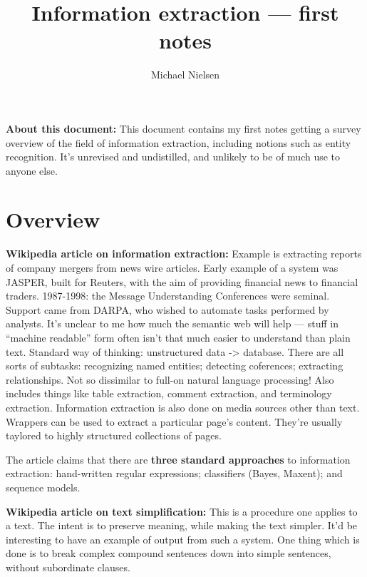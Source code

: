 
\title{Information extraction --- first notes}
\author{Michael Nielsen}



\maketitle

\textbf{About this document:} This document contains my first notes
getting a survey overview of the field of information extraction,
including notions such as entity recognition.  It's unrevised and
undistilled, and unlikely to be of much use to anyone else.


\section{Overview}

\textbf{Wikipedia article on information extraction:} Example is
extracting reports of company mergers from news wire articles.  Early
example of a system was JASPER, built for Reuters, with the aim of
providing financial news to financial traders.  1987-1998: the Message
Understanding Conferences were seminal.  Support came from DARPA, who
wished to automate tasks performed by analysts.  It's unclear to me
how much the semantic web will help --- stuff in ``machine readable''
form often isn't that much easier to understand than plain text.
Standard way of thinking: unstructured data -> database.  There are
all sorts of subtasks: recognizing named entities; detecting
coferences; extracting relationships.  Not so dissimilar to full-on
natural language processing! Also includes things like table
extraction, comment extraction, and terminology extraction.
Information extraction is also done on media sources other than text.
Wrappers can be used to extract a particular page's content.  They're
usually taylored to highly structured collections of pages.

The article claims that there are \textbf{three standard approaches}
to information extraction: hand-written regular expressions;
classifiers (Bayes, Maxent); and sequence models.

\textbf{Wikipedia article on text simplification:} This is a procedure
one applies to a text.  The intent is to preserve meaning, while
making the text simpler.  It'd be interesting to have an example of
output from such a system.  One thing which is done is to break
complex compound sentences down into simple sentences, without
subordinate clauses.

